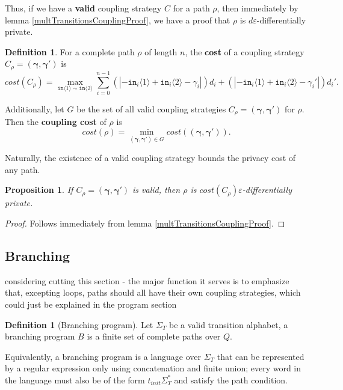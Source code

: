 \documentclass[12pt]{article}
\newcommand{\brangle}[1]{\langle#1 \rangle}
\newtheorem{prop}[thm]{Proposition}
\theoremstyle{definition}
\newtheorem{defn}[thm]{Definition}
\begin{document}
Thus, if we have a \textbf{valid} coupling strategy $C$ for a path $\rho$, then immediately by lemma \ref{multTransitionsCouplingProof}, we have a proof that $\rho$ is $d\varepsilon$-differentially private. 

\begin{defn}
    For a complete path $\rho$ of length $n$, the \textbf{cost} of a coupling strategy $C_\rho=(\bm{\gamma}, \bm{\gamma}')$ is \[cost(C_\rho) = \max_{\texttt{in}\brangle{1}\sim\texttt{in}\brangle{2}}\sum_{i=0}^{n-1}(|-\texttt{in}_i\brangle{1}+\texttt{in}_i\brangle{2}-\gamma_i|)d_i+(|-\texttt{in}_i\brangle{1}+\texttt{in}_i\brangle{2}-\gamma_i'|)d_i'.\]

    Additionally, let $G$ be the set of all valid coupling strategies $C_\rho=(\bm{\gamma}, \bm{\gamma}')$ for $\rho$. Then the \textbf{coupling cost} of $\rho$ is 
    \[cost(\rho) = \min_{(\bm{\gamma}, \bm{\gamma}')\in G}cost((\bm{\gamma}, \bm{\gamma}')).\]
\end{defn}

Naturally, the existence of a valid coupling strategy bounds the privacy cost of any path. 

\begin{prop}
    If $C_\rho=(\bm{\gamma}, \bm{\gamma}')$ is valid, then $\rho$ is $cost(C_\rho)\varepsilon$-differentially private.
\end{prop}

\begin{proof}
    Follows immediately from lemma \ref{multTransitionsCouplingProof}.
\end{proof}


\subsection{Branching} 
{\color{red} considering cutting this section - the major function it serves is to emphasize that, excepting loops, paths should all have their own coupling strategies, which could just be explained in the program section}


\begin{defn}[Branching program]
    Let $\Sigma_T$ be a valid transition alphabet, a branching program $B$ is a finite set of complete paths over $Q$.
\end{defn}

Equivalently, a branching program is a language over $\Sigma_T$ that can be represented by a regular expression only using concatenation and finite union; every word in the language must also be of the form $t_{init}\Sigma_T^*$ and satisfy the path condition. 
\end{document}
